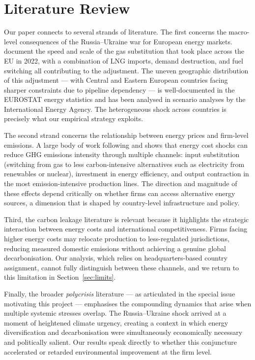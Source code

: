 \documentclass[12pt,a4paper]{article}
\begin{document}
\section{Literature Review}
\label{sec:lit}

Our paper connects to several strands of literature. The first concerns the macro-level consequences of the Russia–Ukraine war for European energy markets. \citet{BauerEtAl2023} document the speed and scale of the gas substitution that took place across the EU in 2022, with a combination of LNG imports, demand destruction, and fuel switching all contributing to the adjustment. The uneven geographic distribution of this adjustment — with Central and Eastern European countries facing sharper constraints due to pipeline dependency — is well-documented in the EUROSTAT energy statistics and has been analysed in scenario analyses by the International Energy Agency. The heterogeneous shock across countries is precisely what our empirical strategy exploits.

The second strand concerns the relationship between energy prices and firm-level emissions. A large body of work following \citet{Martin2016} and \citet{RavikumarEtAl2022} shows that energy cost shocks can reduce GHG emissions intensity through multiple channels: input substitution (switching from gas to less carbon-intensive alternatives such as electricity from renewables or nuclear), investment in energy efficiency, and output contraction in the most emission-intensive production lines. The direction and magnitude of these effects depend critically on whether firms can access alternative energy sources, a dimension that is shaped by country-level infrastructure and policy.

Third, the carbon leakage literature is relevant because it highlights the strategic interaction between energy costs and international competitiveness. Firms facing higher energy costs may relocate production to less-regulated jurisdictions, reducing measured domestic emissions without achieving a genuine global decarbonisation. Our analysis, which relies on headquarters-based country assignment, cannot fully distinguish between these channels, and we return to this limitation in Section~\ref{sec:limits}.

Finally, the broader \textit{polycrisis} literature — as articulated in the special issue motivating this project — emphasises the compounding dynamics that arise when multiple systemic stresses overlap. The Russia–Ukraine shock arrived at a moment of heightened climate urgency, creating a context in which energy diversification and decarbonisation were simultaneously economically necessary and politically salient. Our results speak directly to whether this conjuncture accelerated or retarded environmental improvement at the firm level.
\end{document}
